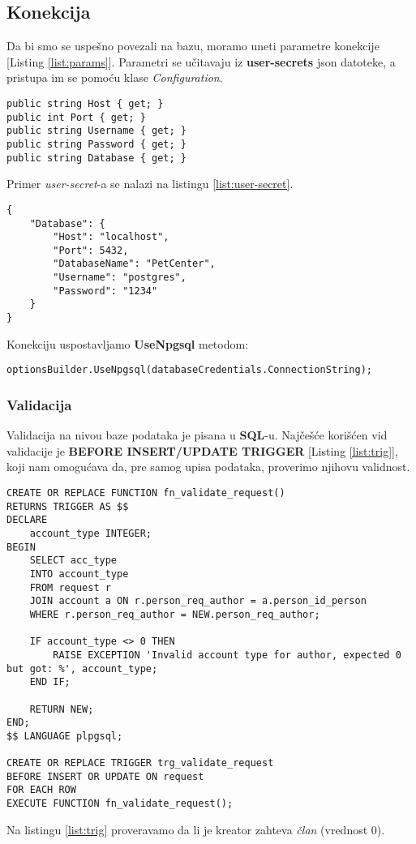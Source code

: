 \subsection*{Konekcija}
\par Da bi smo se uspešno povezali na bazu, moramo uneti parametre konekcije [Listing \ref{list:params}]. Parametri se učitavaju iz
\textbf{user-secrets} json datoteke, a pristupa im se pomoću klase \textit{Configuration}.
\begin{lstlisting}[caption={Parametri konekcije}, captionpos=b, label={list:params}]
public string Host { get; }
public int Port { get; }
public string Username { get; }
public string Password { get; }
public string Database { get; }
\end{lstlisting}
\par Primer \textit{user-secret}-a se nalazi na listingu \ref{list:user-secret}.
\begin{lstlisting}[caption={Primer \textit{user-secret}}, captionpos=b, label={list:user-secret}]
{
    "Database": {
        "Host": "localhost",
        "Port": 5432,
        "DatabaseName": "PetCenter",
        "Username": "postgres",
        "Password": "1234"
    }
}
\end{lstlisting}
\par Konekciju uspostavljamo \textbf{UseNpgsql} metodom:
\begin{lstlisting}[caption={Uspostavljanje konekcije}, captionpos=b]
optionsBuilder.UseNpgsql(databaseCredentials.ConnectionString);
\end{lstlisting}
\subsubsection*{Validacija}
\par Validacija na nivou baze podataka je pisana u \textbf{SQL}-u. Najčešće korišćen
vid validacije je \textbf{BEFORE INSERT/UPDATE TRIGGER} [Listing \ref{list:trig}], koji nam omogućava da, pre samog upisa podataka, proverimo njihovu validnost.
\begin{lstlisting}[caption={Primer validacije pomoću trigera}, captionpos=b, label=list:trig]
CREATE OR REPLACE FUNCTION fn_validate_request()
RETURNS TRIGGER AS $$
DECLARE
	account_type INTEGER;
BEGIN
	SELECT acc_type
	INTO account_type
	FROM request r
	JOIN account a ON r.person_req_author = a.person_id_person
	WHERE r.person_req_author = NEW.person_req_author;

	IF account_type <> 0 THEN
		RAISE EXCEPTION 'Invalid account type for author, expected 0 but got: %', account_type;
	END IF;

	RETURN NEW;
END;
$$ LANGUAGE plpgsql;

CREATE OR REPLACE TRIGGER trg_validate_request
BEFORE INSERT OR UPDATE ON request
FOR EACH ROW
EXECUTE FUNCTION fn_validate_request();
\end{lstlisting}
\par Na listingu \ref{list:trig} proveravamo da li je kreator zahteva \textit{član} (vrednost 0).
